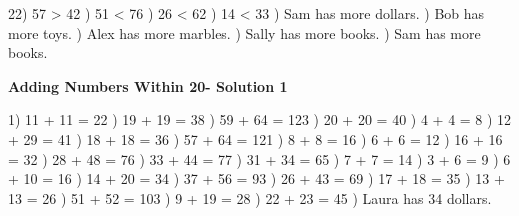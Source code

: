 \documentclass{article}%
\begin{document}
22) 57 > 42%
) 51 < 76%
) 26 < 62%
) 14 < 33%
) Sam has more dollars.%
) Bob has more toys.%
) Alex has more marbles.%
) Sally has more books.%
) Sam has more books.%
\newline%
\newpage%
\large%
\begin{center}%
\textbf{Adding Numbers Within 20- Solution 1}%
\newline%
\end{center} \normalsize%
1) 11 + 11 = 22%
) 19 + 19 = 38%
) 59 + 64 = 123%
) 20 + 20 = 40%
) 4 + 4 = 8%
) 12 + 29 = 41%
) 18 + 18 = 36%
) 57 + 64 = 121%
) 8 + 8 = 16%
) 6 + 6 = 12%
) 16 + 16 = 32%
) 28 + 48 = 76%
) 33 + 44 = 77%
) 31 + 34 = 65%
) 7 + 7 = 14%
) 3 + 6 = 9%
) 6 + 10 = 16%
) 14 + 20 = 34%
) 37 + 56 = 93%
) 26 + 43 = 69%
) 17 + 18 = 35%
) 13 + 13 = 26%
) 51 + 52 = 103%
) 9 + 19 = 28%
) 22 + 23 = 45%
) Laura has 34 dollars.%
\newline%
\end{document}
